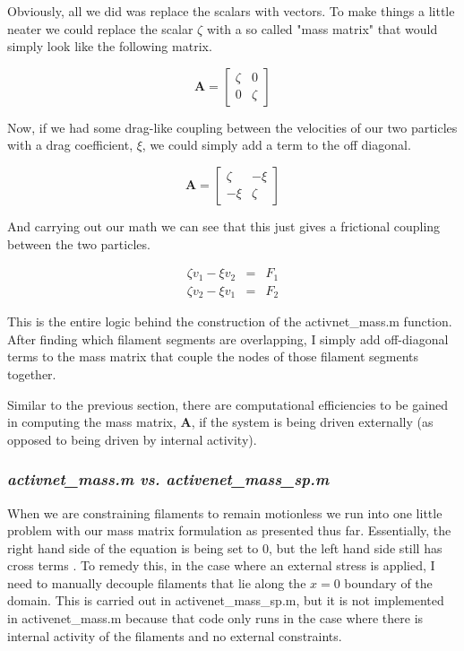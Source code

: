 Obviously, all we did was replace the scalars with vectors.  To make things a little neater we could replace the scalar $\zeta$ with a so called "mass matrix" that would simply look like the following matrix.

\begin{equation}
\mathbf{A} = \begin{bmatrix} \zeta & 0 \\ 0 & \zeta \end{bmatrix}
\end{equation}

Now, if we had some drag-like coupling between the velocities of our two particles with a drag coefficient, $\xi$, we could simply add a term to the off diagonal.

\begin{equation}
\mathbf{A} = \begin{bmatrix} \zeta & -\xi \\ -\xi & \zeta \end{bmatrix}
\end{equation}

And carrying out our math we can see that this just gives a frictional coupling between the two particles.

\begin{equation}
\begin{array}{lcl} \zeta v_1 - \xi v_2  & = & F_1 \\ \zeta v_2 - \xi v_1 & = & F_2 \end{array}
\end{equation}

This is the entire logic behind the construction of the activnet\_mass.m function.  After finding which filament segments are overlapping, I simply add off-diagonal terms to the mass matrix that couple the nodes of those filament segments together.

Similar to the previous section, there are computational efficiencies to be gained in computing the mass matrix, $\mathbf{A}$, if the system is being driven externally (as opposed to being driven by internal activity).  

\subsubsection{\textit{activnet\_mass.m vs. activenet\_mass\_sp.m}}
When we are constraining filaments to remain motionless we run into one little problem with our mass matrix formulation as presented thus far.  Essentially, the right hand side of the equation is being set to 0, but the left hand side still has cross terms .  To remedy this, in the case where an external stress is applied, I need to manually decouple filaments that lie along the $x=0$ boundary of the domain.  This is carried out in activenet\_mass\_sp.m, but it is not implemented in activenet\_mass.m because that code only runs in the case where there is internal activity of the filaments and no external constraints.

